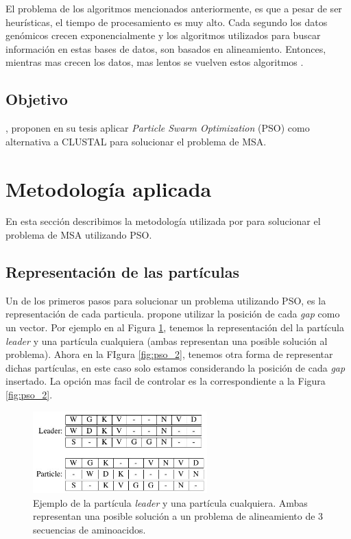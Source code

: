 \documentclass{cup-pan}
\begin{document}
	
	El problema de los algoritmos mencionados anteriormente, es que a pesar de ser heurísticas, el tiempo de procesamiento es muy alto. Cada segundo los datos genómicos crecen exponencialmente \citep{archibald2018genomics} y los algoritmos utilizados para buscar información en estas bases de datos, son basados en alineamiento. Entonces, mientras mas crecen los datos, mas lentos se vuelven estos algoritmos \citep{zablocki2009multiple}. 
	
	\subsection{Objetivo}
	
	\citet{zablocki2009multiple}, proponen en su tesis aplicar \textit{Particle Swarm Optimization} (PSO) como alternativa a CLUSTAL para solucionar el problema de MSA.\\

	
	\section{Metodología aplicada}
	
	En esta sección describimos la metodología utilizada por \citet{zablocki2009multiple} para solucionar el problema de MSA utilizando PSO.
	
	\subsection{Representación de las partículas}
	
	Un de los primeros pasos para solucionar un problema utilizando PSO, es la representación de cada particula. \citet{zablocki2009multiple} propone utilizar la posición de cada \textit{gap} como un vector. Por ejemplo en al Figura \ref{fig:pso_1}, tenemos la representación del la partícula \textit{leader} y una partícula cualquiera (ambas representan una posible solución al problema). Ahora en la FIgura  \ref{fig:pso_2}, tenemos otra forma de representar dichas partículas, en este caso solo estamos considerando la posición de cada \textit{gap} insertado. La opción mas facil de controlar es la correspondiente a la Figura \ref{fig:pso_2}. \\
	
	\begin{figure}[h]
		\centering
		\includegraphics[width=0.6\textwidth]{images/pso_1}
		\caption{Ejemplo de la partícula \textit{leader} y una partícula cualquiera. Ambas representan una posible solución a un problema de alineamiento de 3 secuencias de aminoacidos.}
		\label{fig:pso_1}
	\end{figure}
\end{document}
